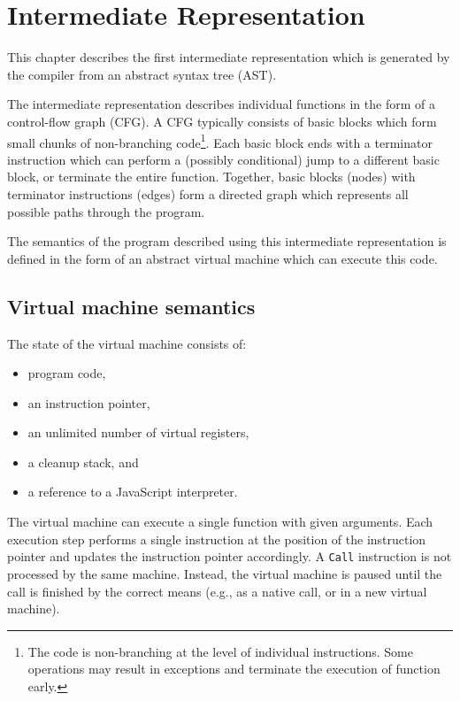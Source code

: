 \chapter{Intermediate Representation}\label{ir}

This chapter describes the first intermediate representation which is generated by the compiler from an abstract syntax tree (AST).

The intermediate representation describes individual functions in the form of a control-flow graph (CFG). A CFG typically consists of basic blocks which form small chunks of non-branching code\footnote{The code is non-branching at the level of individual instructions. Some operations may result in exceptions and terminate the execution of function early.}. Each basic block ends with a terminator instruction which can perform a (possibly conditional) jump to a different basic block, or terminate the entire function. Together, basic blocks (nodes) with terminator instructions (edges) form a directed graph which represents all possible paths through the program.

The semantics of the program described using this intermediate representation is defined in the form of an abstract virtual machine which can execute this code.


\section{Virtual machine semantics}

The state of the virtual machine consists of:
\begin{itemize}
    \item program code,
    \item an instruction pointer,
    \item an unlimited number of virtual registers,
    \item a cleanup stack, and
    \item a reference to a JavaScript interpreter.
\end{itemize}

The virtual machine can execute a single function with given arguments. Each execution step performs a single instruction at the position of the instruction pointer and updates the instruction pointer accordingly. A \texttt{Call} instruction is not processed by the same machine. Instead, the virtual machine is paused until the call is finished by the correct means (e.g., as a native call, or in a new virtual machine).

